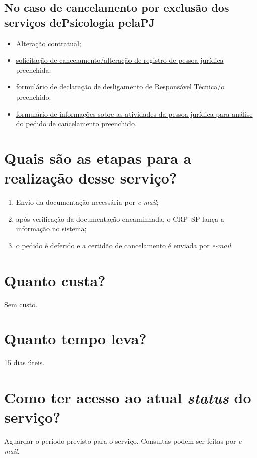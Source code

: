 \subsection{No caso de cancelamento por exclusão dos serviços dePsicologia pelaPJ}

\begin{itemize}
  \item  Alteração contratual;
  \item  \hyperref[]{solicitação  de cancelamento/alteração de registro de pessoa jurídica} preenchida;
  \item  \hyperref[]{formulário  de declaração de desligamento de Responsável Técnica/o} preenchido;
  \item  \hyperref[]{formulário  de informações sobre as atividades da pessoa jurídica para análise do  pedido de cancelamento} preenchido.
\end{itemize}

\section{Quais são as etapas para a realização desse serviço?}

\begin{enumerate}
  \item  Envio da documentação necessária por \emph{e-mail};
  \item  após verificação da documentação encaminhada, o CRP~SP lança a  informação no sistema;
  \item  o pedido é deferido e a certidão de cancelamento é enviada por  \emph{e-mail}.
\end{enumerate}

\section{Quanto custa?}

Sem custo.

\section{Quanto tempo leva?}

15 dias úteis.

\section{Como ter acesso ao atual \emph{status} do serviço?}

Aguardar o período previsto para o serviço. Consultas podem ser feitas por \emph{e-mail.}

